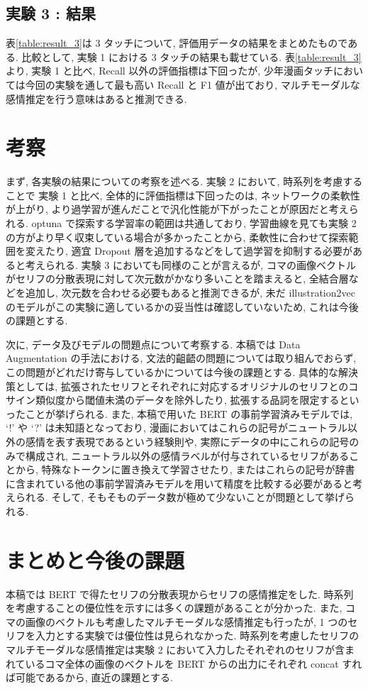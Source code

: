 \documentclass[twocolumn]{jarticle}     %
\begin{document}
\subsection{実験 3 : 結果}
表\ref{table:result_3}は 3 タッチについて, 評価用データの結果をまとめたものである. 比較として, 実験 1 における 3 タッチの結果も載せている.
表\ref{table:result_3}より, 実験 1 と比べ, Recall 以外の評価指標は下回ったが, 少年漫画タッチにおいては今回の実験を通して最も高い Recall と F1 値が出ており, マルチモーダルな感情推定を行う意味はあると推測できる.


\section{考察}
まず, 各実験の結果についての考察を述べる. 実験 2 において,
時系列を考慮することで 実験 1 と比べ, 全体的に評価指標は下回ったのは, ネットワークの柔軟性が上がり, より過学習が進んだことで汎化性能が下がったことが原因だと考えられる. optuna で探索する学習率の範囲は共通しており, 学習曲線を見ても実験 2 の方がより早く収束している場合が多かったことから, 柔軟性に合わせて探索範囲を変えたり, 適宜 Dropout 層を追加するなどをして過学習を抑制する必要があると考えられる. 実験 3 においても同様のことが言えるが, コマの画像ベクトルがセリフの分散表現に対して次元数がかなり多いことを踏まえると, 全結合層などを追加し, 次元数を合わせる必要もあると推測できるが, 未だ illustration2vec のモデルがこの実験に適しているかの妥当性は確認していないため, これは今後の課題とする.

次に, データ及びモデルの問題点について考察する. 本稿では Data Augmentation の手法における, 文法的齟齬の問題については取り組んでおらず, この問題がどれだけ寄与しているかについては今後の課題とする. 具体的な解決策としては, 拡張されたセリフとそれぞれに対応するオリジナルのセリフとのコサイン類似度から閾値未満のデータを除外したり, 拡張する品詞を限定するといったことが挙げられる. また, 本稿で用いた BERT の事前学習済みモデルでは, `!' や `?' は未知語となっており, 漫画においてはこれらの記号がニュートラル以外の感情を表す表現であるという経験則や, 実際にデータの中にこれらの記号のみで構成され, ニュートラル以外の感情ラベルが付与されているセリフがあることから, 特殊なトークンに置き換えて学習させたり, またはこれらの記号が辞書に含まれている他の事前学習済みモデルを用いて精度を比較する必要があると考えられる. そして, そもそものデータ数が極めて少ないことが問題として挙げられる.

\section{まとめと今後の課題}
本稿では BERT で得たセリフの分散表現からセリフの感情推定をした. 時系列を考慮することの優位性を示すには多くの課題があることが分かった. また, コマの画像のベクトルも考慮したマルチモーダルな感情推定も行ったが, 1 つのセリフを入力とする実験では優位性は見られなかった. 時系列を考慮したセリフのマルチモーダルな感情推定は実験 2 において入力したそれぞれのセリフが含まれているコマ全体の画像のベクトルを BERT からの出力にそれぞれ concat すれば可能であるから, 直近の課題とする.
\end{document}
